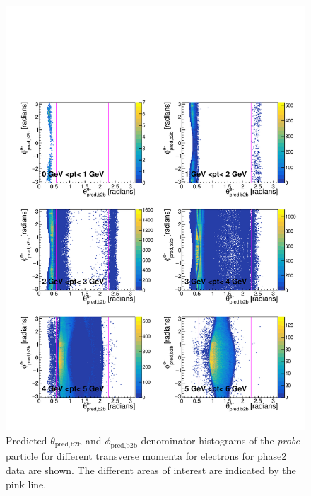 \documentclass[a4paper,11pt,twosided,final,german,openbib,pdftex,listof=totoc,bibliography=totoc]{scrbook}
\begin{document}
\begin{appendix}
\begin{figure}[h!]
	\includegraphics[width=\textwidth]{Plots/master/RTPtMemE_Data.pdf}
	\caption[Enumerator $\theta_{\textrm{pred,b2b}}$-$\phi_{\textrm{pred,b2b}}$ Electron Transverse Momentum Phase2 Data]{Predicted $\theta_{\textrm{pred,b2b}}$ and $\phi_{\textrm{pred,b2b}}$ denominator histograms of the \textit{probe} particle for different transverse momenta for electrons for phase2 data are shown. The different areas of interest are indicated by the pink line.}
	\label{plt:RTPtMemE_Data}
\end{figure}



\end{appendix}
\end{document}
